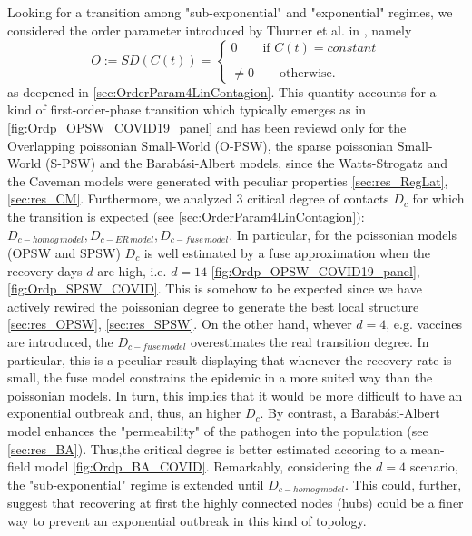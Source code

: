 \documentclass[a4paper,10pt,twoside]{book} %
\theoremstyle{definition}
\begin{document}
Looking for a transition among "sub-exponential" and "exponential" regimes, we considered the order parameter introduced by Thurner et al. in \cite{Thurner::NetBasedExpl}, namely
\begin{equation}
	O := SD(C(t)) = 
	\begin{cases}
		0 \qquad \text{if $C(t) = constant$}\\\\
		\neq 0 \qquad \text{otherwise.} 
	\end{cases}
	\label{eq:res_def_OrdP}
\end{equation}
as deepened in \autoref{sec:OrderParam4LinContagion}.
This quantity accounts for a kind of first-order-phase transition which typically emerges as in \autoref{fig:Ordp_OPSW_COVID19_panel} and has been reviewd only for the Overlapping poissonian Small-World (O-PSW), the sparse poissonian Small-World (S-PSW) and the Barabási-Albert models, since the Watts-Strogatz and the Caveman models were generated with peculiar properties \autoref{sec:res_RegLat}, \autoref{sec:res_CM}. 
Furthermore, we analyzed 3 critical degree of contacts $D_c$ for which the transition is expected (see \autoref{sec:OrderParam4LinContagion}): $D_{c-homog \, model}, D_{c-ER \, model}, D_{c-fuse \, model}$. 
In particular, for the poissonian models (OPSW and SPSW) $D_c$ is well estimated by a fuse approximation when the recovery days $d$  are high, i.e. $d = 14$ \autoref{fig:Ordp_OPSW_COVID19_panel}, \autoref{fig:Ordp_SPSW_COVID}. This is somehow to be expected since we have actively rewired the poissonian degree to generate the best local structure \autoref{sec:res_OPSW}, \autoref{sec:res_SPSW}.
On the other hand, whever $ d = 4$, e.g. vaccines are introduced, the  $D_{c-fuse \, model}$ overestimates the real transition degree. In particular, this is a peculiar result displaying that whenever the recovery rate is small, the fuse model constrains the epidemic in a more suited way than the poissonian models. In turn, this implies that it would be more difficult to have an exponential outbreak and, thus, an higher $ D_c$.
By contrast, a Barabási-Albert model enhances the "permeability" of the pathogen into the population (see \autoref{sec:res_BA}). Thus,the critical degree is better estimated accoring to a mean-field model \autoref{fig:Ordp_BA_COVID}. Remarkably, considering the $d = 4$ scenario, the "sub-exponential" regime is extended until $D_{c-homog \, model}$. This could, further, suggest that recovering at first the highly connected nodes (hubs) could be a finer way to prevent an exponential outbreak in this kind of topology.
\end{document}
